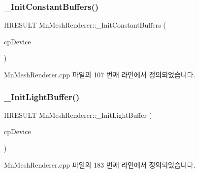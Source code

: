 \subsubsection{\texorpdfstring{\+\_\+\+Init\+Constant\+Buffers()}{\_InitConstantBuffers()}}
{\footnotesize\ttfamily H\+R\+E\+S\+U\+LT Mn\+Mesh\+Renderer\+::\+\_\+\+Init\+Constant\+Buffers (\begin{DoxyParamCaption}\item[{const \hyperlink{namespace_m_n_l_a1eec210db8f309a4a9ac0d9658784c31}{C\+P\+D3\+D\+Device} \&}]{cp\+Device }\end{DoxyParamCaption})\hspace{0.3cm}{\ttfamily [private]}}



Mn\+Mesh\+Renderer.\+cpp 파일의 107 번째 라인에서 정의되었습니다.

\mbox{\label{class_m_n_l_1_1_mn_mesh_renderer_a8beea41d6ea1f0061d495ed7cca05926}} 
\subsubsection{\texorpdfstring{\+\_\+\+Init\+Light\+Buffer()}{\_InitLightBuffer()}}
{\footnotesize\ttfamily H\+R\+E\+S\+U\+LT Mn\+Mesh\+Renderer\+::\+\_\+\+Init\+Light\+Buffer (\begin{DoxyParamCaption}\item[{const \hyperlink{namespace_m_n_l_a1eec210db8f309a4a9ac0d9658784c31}{C\+P\+D3\+D\+Device} \&}]{cp\+Device }\end{DoxyParamCaption})\hspace{0.3cm}{\ttfamily [private]}}



Mn\+Mesh\+Renderer.\+cpp 파일의 183 번째 라인에서 정의되었습니다.

\mbox{\label{class_m_n_l_1_1_mn_mesh_renderer_a1478d6e5f9244bd15087fa2271a03420}} 
